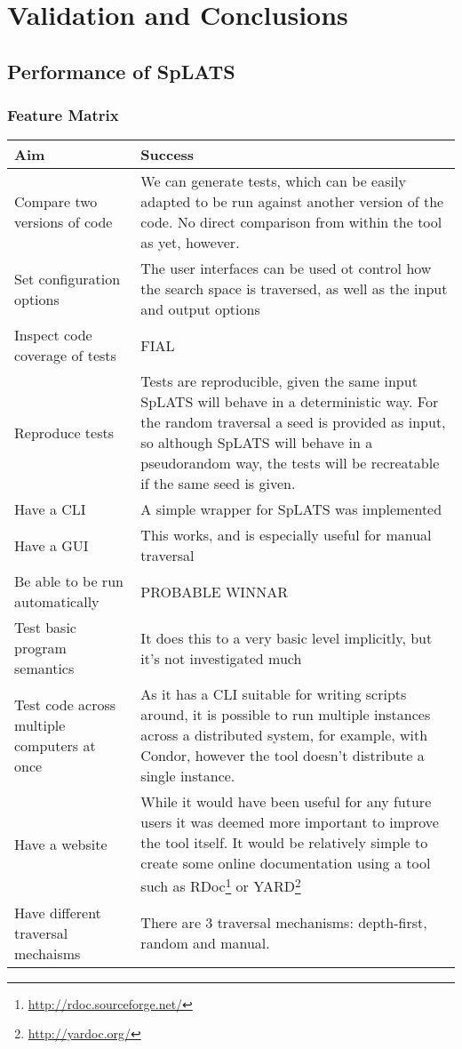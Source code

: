 \chapter{Validation and Conclusions}
\section{Performance of SpLATS}
  \subsection{Feature Matrix}
    \begin{tabular}{p{} | p{}}
    Aim & Success \\
    \hline
    Compare two versions of code &
    We can generate tests, which can be easily adapted to be run against another version of the code.
    No direct comparison from within the tool as yet, however. \\
    Set configuration options & The user interfaces can be used ot control how the search space is traversed, as well as the input and output options \\
    Inspect code coverage of tests & FIAL \\
    Reproduce tests & Tests are reproducible, given the same input SpLATS will behave in a deterministic way. For the random traversal a seed is provided as input, so although SpLATS will behave
    in a pseudorandom way, the tests will be recreatable if the same seed is given.\\
    Have a CLI &
    A simple wrapper for SpLATS was implemented \\
    \hline
    Have a GUI &
    This works, and is especially useful for manual traversal \\
    Be able to be run automatically & PROBABLE WINNAR \\
    Test basic program semantics &
    It does this to a very basic level implicitly, but it's not investigated much \\
    Test code across multiple computers at once &
    As it has a CLI suitable for writing scripts around, it is possible to run multiple instances across a distributed system, for example, with Condor, however the tool doesn't distribute a single instance. \\
    \hline
    Have a website &
    While it would have been useful for any future users it was deemed more important to improve the tool itself. It would be relatively simple to create some online documentation using a tool such as 
    RDoc\footnote{\url{http://rdoc.sourceforge.net/}} or YARD\footnote{\url{http://yardoc.org/}} \\
    Have different traversal mechaisms &
    There are 3 traversal mechanisms: depth-first, random and manual. \\
    \end{tabular}

